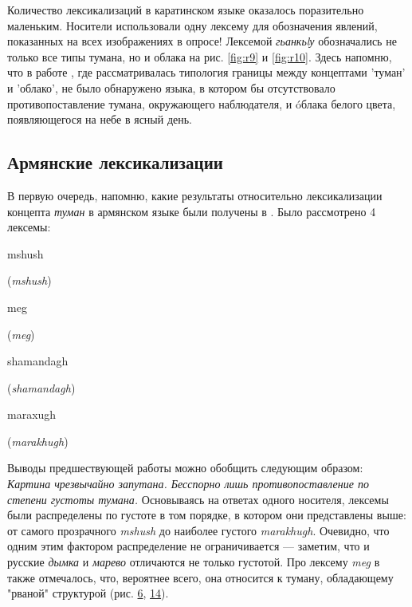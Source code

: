 \par Количество лексикализаций в каратинском языке оказалось поразительно маленьким. Носители использовали одну лексему для обозначения явлений, показанных на всех изображениях в опросе! Лексемой \textit{гьанкьlу} обозначались не только все типы тумана, но и облака на рис. \ref{fig:r9} и \ref{fig:r10}. Здесь напомню, что в работе \citep{соколовский2017}, где рассматривалась типология границы между концептами 'туман' и 'облако', не было обнаружено языка, в котором бы отсутствовало противопоставление тумана, окружающего наблюдателя, и óблака белого цвета, появляющегося на небе в ясный день.


\subsection{Армянские лексикализации}
\par В первую очередь, напомню, какие результаты относительно лексикализации концепта \textit{туман} в армянском языке были получены в \citep{соколовский2017}.
Было рассмотрено 4 лексемы:
\begin{itemize}[topsep=0pt,itemsep=0pt,parsep=0pt,partopsep=0pt,leftmargin=2.5cm]
    \begin{multicols}{2}
    \item \begin{armenian} \; mshush \end{armenian}  (\textit{mshush})
    \item \begin{armenian} \; meg \end{armenian}  (\textit{meg})
    \item \begin{armenian} \; shamandagh \end{armenian}  (\textit{shamandagh})
    \item \begin{armenian} \; maraxugh \end{armenian}  (\textit{marakhugh})
    \end{multicols}
\end{itemize}
\par Выводы предшествующей работы можно обобщить следующим образом: \textit{Картина чрезвычайно запутана. Бесспорно лишь противопоставление по степени густоты тумана.} Основываясь на ответах одного носителя, лексемы были распределены по густоте в том порядке, в котором они представлены выше: от самого прозрачного \textit{mshush} до наиболее густого \textit{marakhugh}. Очевидно, что одним этим фактором распределение не ограничивается --- заметим, что и русские \textit{дымка} и \textit{марево} отличаются не только густотой. Про лексему \textit{meg} в \citep{соколовский2017} также отмечалось, что, вероятнее всего, она относится к туману, обладающему "рваной" структурой (рис. \hyperlink{p6}{6}, \hyperlink{p14}{14}). 

